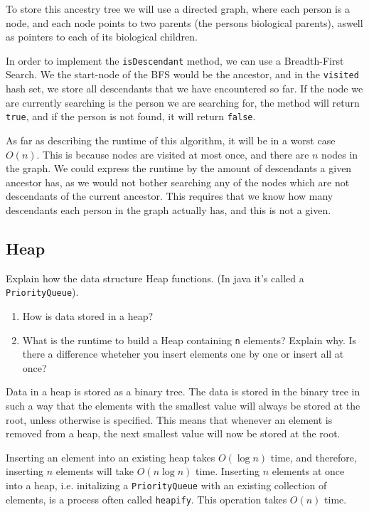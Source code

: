 \documentclass{article}
\begin{document}
    \begin{ans}
        To store this ancestry tree we will use a directed graph, where each person is a node, and each node points to two parents (the persons biological parents), aswell as pointers to each of its biological children.
        \medskip

        In order to implement the \texttt{isDescendant} method, we can use a Breadth-First Search. We the start-node of the BFS would be the ancestor, and in the \texttt{visited} hash set, we store all descendants that we have encountered so far. If the node we are currently searching is the person we are searching for, the method will return \texttt{true}, and if the person is not found, it will return \texttt{false}.
        \medskip

        As far as describing the runtime of this algorithm, it will be in a worst case \( O\left( n \right) \). This is because nodes are visited at most once, and there are \( n \) nodes in the graph. We could express the runtime by the amount of descendants a given ancestor has, as we would not bother searching any of the nodes which are not descendants of the current ancestor. This requires that we know how many descendants each person in the graph actually has, and this is not a given.
    \end{ans}

    \subsection{Heap}
    Explain how the data structure Heap functions. (In java it's called a \texttt{PriorityQueue}).

    \begin{enumerate}
        \item How is data stored in a heap?
        \item What is the runtime to build a Heap containing \texttt{n} elements? Explain why. Is there a difference wheteher you insert elements one by one or insert all at once?
    \end{enumerate}

    \begin{ans}
        Data in a heap is stored as a binary tree. The data is stored in the binary tree in such a way that the elements with the smallest value will always be stored at the root, unless otherwise is specified. This means that whenever an element is removed from a heap, the next smallest value will now be stored at the root.
        \medskip

        Inserting an element into an existing heap takes \( O\left( \log n \right) \) time, and therefore, inserting \( n \) elements will take \( O\left( n \log n \right) \) time. Inserting \( n \) elements at once into a heap, i.e. initalizing a \texttt{PriorityQueue} with an existing collection of elements, is a process often called \texttt{heapify}. This operation takes \( O(n) \) time.
    \end{ans}
\end{document}
